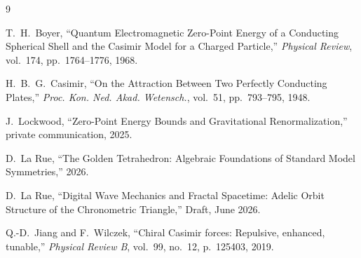 \begin{thebibliography}{9}

T.~H.~Boyer,
``Quantum Electromagnetic Zero-Point Energy of a Conducting Spherical Shell and the Casimir Model for a Charged Particle,''
\emph{Physical Review}, vol.~174, pp.~1764--1776, 1968.

H.~B.~G.~Casimir,
``On the Attraction Between Two Perfectly Conducting Plates,''
\emph{Proc. Kon. Ned. Akad. Wetensch.}, vol.~51, pp.~793--795, 1948.

J.~Lockwood,
``Zero-Point Energy Bounds and Gravitational Renormalization,''
private communication, 2025.

D.~La Rue,
``The Golden Tetrahedron: Algebraic Foundations of Standard Model Symmetries,''
2026.

D.~La Rue,
``Digital Wave Mechanics and Fractal Spacetime:
Adelic Orbit Structure of the Chronometric Triangle,''
Draft, June 2026.

Q.-D.~Jiang and F.~Wilczek,
``Chiral Casimir forces: Repulsive, enhanced, tunable,''
\emph{Physical Review B}, vol.~99, no.~12, p.~125403, 2019.

\end{thebibliography}
